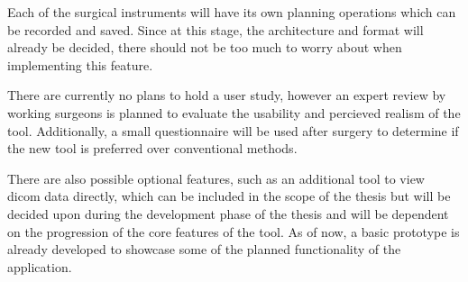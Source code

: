 Each of the surgical instruments will have its own planning operations which can be recorded and saved.
Since at this stage, the architecture and format will already be decided, there should not be too much to worry about when implementing this feature.

There are currently no plans to hold a user study, however an expert review by working surgeons is planned to evaluate the usability and percieved realism of the tool.
Additionally, a small questionnaire will be used after surgery to determine if the new tool is preferred over conventional methods.

There are also possible optional features, such as an additional tool to view dicom data directly, which can be included in the scope of the thesis but will be decided upon during the development phase of the thesis and will be dependent on the progression of the core features of the tool.
As of now, a basic prototype is already developed to showcase some of the planned functionality of the application.